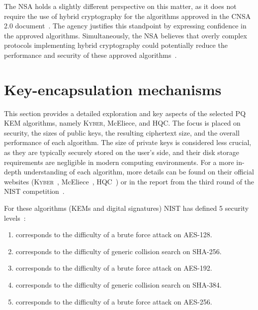 The NSA holds a slightly different perspective on this matter, as it does not require the use of hybrid cryptography for the algorithms approved in the CNSA 2.0 document~\cite{NSA.report}. The agency justifies this standpoint by expressing confidence in the approved algorithms. Simultaneously, the NSA believes that overly complex protocols implementing hybrid cryptography could potentially reduce the performance and security of these approved algorithms~\cite{NSA.QaA}.



\section{Key-encapsulation mechanisms}
\label{sec: KEM}

This section provides a detailed exploration and key aspects of the selected PQ KEM algorithms, namely \textsc{Kyber}, McEliece, and HQC. The focus is placed on security, the sizes of public keys, the resulting ciphertext size, and the overall performance of each algorithm. The size of private keys is considered less crucial, as they are typically securely stored on the user's side, and their disk storage requirements are negligible in modern computing environments. For a more in-depth understanding of each algorithm, more details can be found on their official websites (\textsc{Kyber}~\cite{kem.kyber}, McEliece~\cite{kem.McEliece}, HQC~\cite{kem.HQC}) or in the report from the third round of the NIST competition~\cite{NIST.round3.report}.

\bigskip

\noindent For these algorithms (KEMs and digital signatures) NIST has defined 5 security levels~\cite{NUKIB.min.attachment}:
\begin{enumerate}
    \item corresponds to the difficulty of a brute force attack on AES-128.
    \item corresponds to the difficulty of generic collision search on SHA-256.
    \item corresponds to the difficulty of a brute force attack on AES-192.
    \item corresponds to the difficulty of generic collision search on SHA-384.
    \item corresponds to the difficulty of a brute force attack on AES-256.
\end{enumerate}

